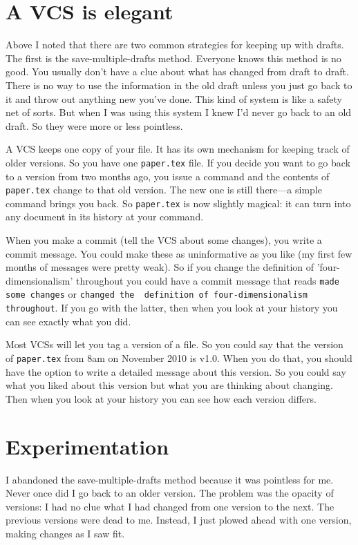 \documentclass{article}
\begin{document}
\section{A VCS is elegant}

Above I noted that there are two common strategies for keeping up with 
drafts. The first is the save-multiple-drafts method. Everyone knows 
this method is no good. You usually don't have a clue about what has 
changed from draft to draft. There is no way to use the information in 
the old draft unless you just go back to it and throw out anything new 
you've done. This kind of system is like a safety net of sorts. But 
when I was using this system I knew I'd never go back to an old draft. 
So they were more or less pointless.

A VCS keeps one copy of your file. It has its own mechanism for 
keeping track of older versions. So you have one \lstinline!paper.tex!  
file. If you decide you want to go back to a version from two months 
ago, you issue a command and the contents of \lstinline!paper.tex! change 
to that old version. The new one is still there—a simple command 
brings you back. So \lstinline!paper.tex! is now slightly magical: it can 
turn into any document in its history at your command.

When you make a commit (tell the VCS about some changes), you write a 
commit message. You could make these as uninformative as you like (my 
first few months of messages were pretty weak). So if you change the 
definition of 'four-dimensionalism' throughout you could have a commit 
message that reads \lstinline!made some changes! or \lstinline!changed the 
definition of four-dimensionalism throughout!. If you go with the 
latter, then when you look at your history you can see exactly what 
you did.

Most VCSs will let you tag a version of a file. So you could say that 
the version of \lstinline!paper.tex! from 8am on November 2010 is v1.0. 
When you do that, you should have the option to write a detailed 
message about this version. So you could say what you liked about this 
version but what you are thinking about changing.  Then when you look 
at your history you can see how each version differs.

\section{Experimentation}

I abandoned the save-multiple-drafts method because it was pointless 
for me. Never once did I go back to an older version. The problem was 
the opacity of versions: I had no clue what I had changed from one 
version to the next. The previous versions were dead to me. Instead, I 
just plowed ahead with one version, making changes as I saw fit.
\end{document}

